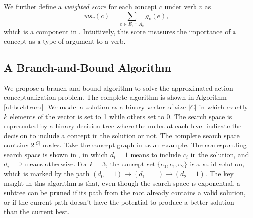 We further define a {\em weighted score} for each concept $c$ under verb
$v$ as
\begin{equation}
ws_v(c) = \sum_{e\in E_c \cap A_v} g_v(e),
\label{eq:ws}
\end{equation}
which is a component in . Intuitively, this score measures
the importance of a concept as a type of argument to a verb.

\subsection{A Branch-and-Bound Algorithm}
We propose a branch-and-bound algorithm to solve the approximated
action conceptualization problem.
The complete algorithm is shown in Algorithm \ref{al:backtrack}.
We model a solution as a binary vector of size $|C|$ in which exactly
$k$ elements of the vector is set to 1 while others set to 0.
The search space is represented by a binary decision tree
where the nodes at each level indicate the decision to include a concept in
the solution or not. The complete search space contains $2^{|C|}$ nodes.
Take the concept graph in  as an example.
The corresponding search space is shown in ,
in which $d_i=1$ means to include $c_i$ in the solution, and $d_i=0$ means
otherwise. For $k=3$, the concept set $\{c_0,c_1,c_2\}$ is
a valid solution, which is marked by the path
$(d_0=1) \rightarrow (d_1=1) \rightarrow (d_2=1)$. The key insight in this algorithm
is that, even though the search space is exponential, a subtree can be
pruned if its path from the root already contains a valid solution, or
if the current path doesn't have the potential to produce a better solution
than the current best.

